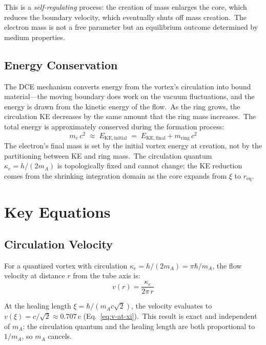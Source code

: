 \documentclass[12pt,letterpaper]{article}
\begin{document}
This is a \emph{self-regulating} process: the creation of mass enlarges the
core, which reduces the boundary velocity, which eventually shuts off mass
creation.\ The electron mass is not a free parameter but an equilibrium
outcome determined by medium properties.

\subsection{Energy Conservation}
\label{sec:energy-conservation}

The DCE mechanism converts energy from the vortex's circulation into bound
material---the moving boundary does work on the vacuum fluctuations, and
the energy is drawn from the kinetic energy of the flow.\ As the ring grows,
the circulation KE decreases by the same amount that the ring mass increases.\
The total energy is approximately conserved during the formation process:
%
\begin{equation}
  m_e\,c^2 \;\approx\; E_{\mathrm{KE,initial}}
  \;=\; E_{\mathrm{KE,final}} + m_{\mathrm{ring}}\,c^2
  \label{eq:energy-conservation}
\end{equation}
%
The electron's final mass is set by the initial vortex energy at creation,
not by the partitioning between KE and ring mass.\ The circulation quantum
$\kappa_e = h/(2m_A)$ is topologically fixed and cannot change; the KE
reduction comes from the shrinking integration domain as the core expands
from $\xi$ to $r_{\mathrm{eq}}$.


\section{Key Equations}
\label{sec:equations}

\subsection{Circulation Velocity}
\label{sec:circulation-velocity}

For a quantized vortex with circulation
$\kappa_e = h/(2m_A) = \pi\hbar/m_A$, the flow velocity at distance $r$
from the tube axis is:
%
\begin{equation}
  v(r) = \frac{\kappa_e}{2\pi\,r}
  \label{eq:v-of-r}
\end{equation}

At the healing length $\xi = \hbar/(m_A c\sqrt{2})$, the velocity evaluates
to $v(\xi) = c/\sqrt{2} \approx 0.707\,c$ (Eq.~\ref{eq:v-at-xi}).\ This
result is exact and independent of $m_A$: the circulation quantum and the
healing length are both proportional to $1/m_A$, so $m_A$ cancels.
\end{document}
